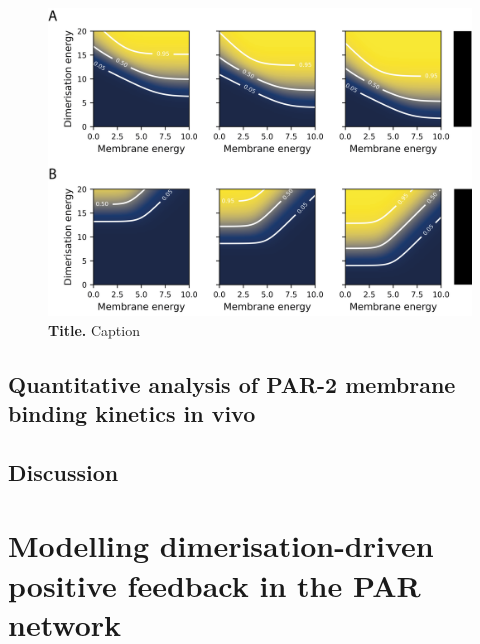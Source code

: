 \documentclass[12pt]{"article"}
\newcommand{\mycaption}[2]{\caption[#1]{\textbf{#1.} #2}}
\begin{document}

\begin{figure}[!h]
\includegraphics[scale=0.9]{thermodynamic_model_dimer_fractions}
\setlength{\abovecaptionskip}{20pt}
\centering
\mycaption{Title}{Caption}
\end{figure}



\clearpage
\subsection{Quantitative analysis of PAR-2 membrane binding kinetics in vivo}


\subsection{Discussion}


\clearpage
\section{Modelling dimerisation-driven positive feedback in the PAR network}
\end{document}
